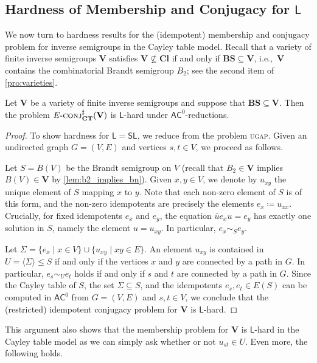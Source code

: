 \documentclass[anonymous,letter,UKenglish,cleveref,autoref,thm-restate]{lipics-v2021}
\renewcommand{\leq}{\leqslant}
\newcommand{\ie}{i.e.,~}
\newcommand{\sse}{\subseteq}
\newcommand{\ACz}{\ensuremath{\mathsf{AC}^0}\xspace}
\newcommand{\LOGSPACE}{\ensuremath{\mathsf{L}}\xspace}
\newcommand{\SL}{\ensuremath{\mathsf{SL}}\xspace}
\newcommand{\vV}{\ensuremath{\mathbf{V}}}
\newcommand{\vCl}{\ensuremath{\mathbf{Cl}}}
\newcommand{\vBS}{\ensuremath{\mathbf{BS}}}  \newcommand{\vBM}{\ensuremath{\mathbf{BM}}}
\theoremstyle{plain}
\theoremstyle{plain}
\newcommand{\dConjS}[2][]{\textup{\textsc{conj${}^{\sharp}_{\mathbf{#1}}\expandafter\ifx\expandafter\relax\detokenize{#2}\relax\else(#2)\fi$}}}
\newcommand{\prob}[1]{\textup{\textsc{#1}}\xspace}
\newcommand{\dUGAP}{\prob{ugap}}
\newcommand{\dEConjS}[2][]{\ensuremath{E}\textnormal{-}\dConjS[#1]{#2}}
\begin{document}
\subsection{Hardness of Membership and Conjugacy for \LOGSPACE{}}\label{sec:SL-hard}

We now turn to hardness results for the (idempotent) membership and conjugacy problem for inverse semigroups in the Cayley table model.
Recall that a variety of finite inverse semigroups $\vV$ satisfies $\vV \not\sse \vCl$ if and only if $\vBS \sse \vV$, \ie $\vV$ contains the combinatorial Brandt semigroup $B_2$; see the second item of \cref{pro:varieties}.

\begin{proposition}\label{pro:conjugacy_sl_hardness}
  Let $\vV$ be a variety of finite inverse semigroups and suppose that $\vBS \sse \vV$.
	Then the problem $\dEConjS[CT]{\vV}$ is \LOGSPACE-hard under \ACz-reductions.
\end{proposition}

\begin{proof}
  To show hardness for $\LOGSPACE{} = \SL{}$, we reduce from the problem \dUGAP.
	Given an undirected graph $G = (V, E)$ and vertices $s,t \in V$, we proceed as follows.
	
	Let $S = B(V)$ be the Brandt semigroup on $V$ (recall that $B_2 \in \vV$ implies $B(V) \in \vV$ by \cref{lem:b2_implies_bn}).
	Given $x,y \in V$, we denote by $u_{xy}$ the unique element of $S$ mapping $x$ to $y$.
	Note that each non-zero element of $S$ is of this form, and the non-zero idempotents are precisely the elements $e_x \coloneqq u_{xx}$.
	Crucially, for fixed idempotents $e_x$ and $e_y$, the equation $\bar u e_x u = e_y$ has exactly one solution in $S$, namely the element $u = u_{xy}$.
  	In particular, $e_x \sim_S e_y$.
	
	Let $\Sigma = \{ e_x \mid x \in V \} \cup \{ u_{xy} \mid xy \in E \}$.
	An element $u_{xy}$ is contained in $U = \langle \Sigma \rangle \leq S$ if and only if the vertices $x$ and $y$ are connected by a path in $G$.
	In particular, $e_s \sim_U e_t$ holds if and only if $s$ and $t$ are connected by a path in $G$.
	Since the Cayley table of $S$, the set $\Sigma \subseteq S$, and the idempotents $e_s, e_t \in E(S)$ can be computed in \ACz from $G = (V,E)$ and $s,t \in V$, we conclude that the (restricted) idempotent conjugacy problem for $\vV$ is \LOGSPACE-hard.
\end{proof}

This argument also shows that the membership problem for $\vV$ is \LOGSPACE-hard in the Cayley table model as we can simply ask whether or not $u_{st} \in U$.
Even more, the following holds.
\end{document}
